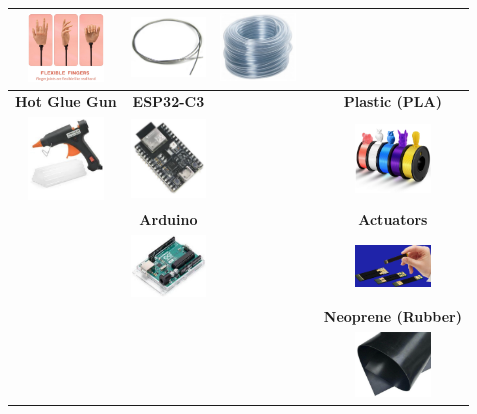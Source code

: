 \documentclass{article}
\begin{document}
\begin{table}[h]
\begin{tabular}{|c|c|c|c|c|}
        \includegraphics[width=2cm]{mor8.png} & 
        \includegraphics[width=2cm]{mor9.png} & 
        \includegraphics[width=2cm]{mor10.png} \\
        \hline
        \textbf{Hot Glue Gun} & \textbf{ESP32-C3} & & & \textbf{Plastic (PLA)} \\
        \includegraphics[width=2cm]{mor11.png} & 
        \includegraphics[width=2cm]{mor12.png} & 
        & 
        & 
        \includegraphics[width=2cm]{mor13.png} \\
        \hline
        & \textbf{Arduino} & & & \textbf{Actuators} \\
        & 
        \includegraphics[width=2cm]{mor14.png} & 
        & 
        & 
        \includegraphics[width=2cm]{mor15.png} \\
        \hline
        & & & & \textbf{Neoprene (Rubber)} \\
        & & & & 
        \includegraphics[width=2cm]{mor16.png} \\
        \hline
    \end{tabular}
\end{table}
\end{document}
